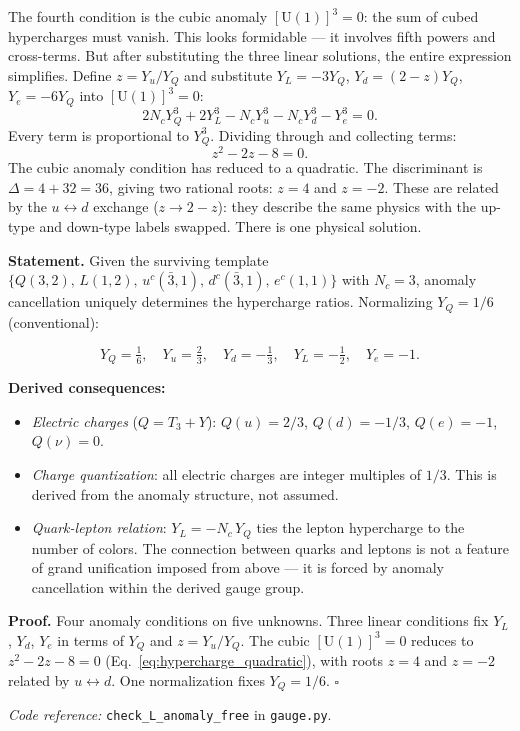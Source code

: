 \documentclass[11pt]{article}
\newenvironment{varlist}{\begin{itemize}[nosep,leftmargin=2em]}{\end{itemize}}
\newcommand{\coderef}[2]{\smallskip\noindent\textit{Code reference:} \texttt{#1} in \texttt{#2}.}
\newcommand{\U}{\mathrm{U}}
\begin{document}
The fourth condition is the cubic anomaly $[\U(1)]^3 = 0$: the sum of cubed hypercharges must vanish.  This looks formidable --- it involves fifth powers and cross-terms.  But after substituting the three linear solutions, the entire expression simplifies.  Define $z = Y_u / Y_Q$ and substitute $Y_L = -3Y_Q$, $Y_d = (2-z)Y_Q$, $Y_e = -6Y_Q$ into $[\U(1)]^3 = 0$:
\begin{equation}
2 N_c Y_Q^3 + 2 Y_L^3 - N_c Y_u^3 - N_c Y_d^3 - Y_e^3 = 0.
\end{equation}
Every term is proportional to $Y_Q^3$.  Dividing through and collecting terms:
\begin{equation}
z^2 - 2z - 8 = 0.
\label{eq:hypercharge_quadratic}
\end{equation}
The cubic anomaly condition has reduced to a quadratic.  The discriminant is $\Delta = 4 + 32 = 36$, giving two rational roots: $z = 4$ and $z = -2$.  These are related by the $u \leftrightarrow d$ exchange ($z \to 2 - z$): they describe the same physics with the up-type and down-type labels swapped.  There is one physical solution.

\begin{tcolorbox}[apfbox, title={$L_{\mathrm{hypercharge}}$ (Unique Hypercharge Assignment)}]
\textbf{Statement.}  Given the surviving template $\{Q(3,2),\, L(1,2),\, u^c(\bar{3},1),\, d^c(\bar{3},1),\, e^c(1,1)\}$ with $N_c = 3$, anomaly cancellation uniquely determines the hypercharge ratios.  Normalizing $Y_Q = 1/6$ (conventional):

\begin{equation}
Y_Q = \tfrac{1}{6}, \quad Y_u = \tfrac{2}{3}, \quad Y_d = -\tfrac{1}{3}, \quad Y_L = -\tfrac{1}{2}, \quad Y_e = -1.
\label{eq:hypercharges}
\end{equation}

\smallskip\noindent\textbf{Derived consequences:}
\begin{varlist}
\item \textit{Electric charges} ($Q = T_3 + Y$): $Q(u) = 2/3$, $Q(d) = -1/3$, $Q(e) = -1$, $Q(\nu) = 0$.
\item \textit{Charge quantization}: all electric charges are integer multiples of $1/3$.  This is derived from the anomaly structure, not assumed.
\item \textit{Quark-lepton relation}: $Y_L = -N_c \, Y_Q$ ties the lepton hypercharge to the number of colors.  The connection between quarks and leptons is not a feature of grand unification imposed from above --- it is forced by anomaly cancellation within the derived gauge group.
\end{varlist}

\smallskip\noindent\textbf{Proof.}  Four anomaly conditions on five unknowns.  Three linear conditions fix $Y_L$, $Y_d$, $Y_e$ in terms of $Y_Q$ and $z = Y_u/Y_Q$.  The cubic $[\U(1)]^3 = 0$ reduces to $z^2 - 2z - 8 = 0$ (Eq.~\ref{eq:hypercharge_quadratic}), with roots $z = 4$ and $z = -2$ related by $u \leftrightarrow d$.  One normalization fixes $Y_Q = 1/6$.  $\square$

\coderef{check\_L\_anomaly\_free}{gauge.py}
\end{tcolorbox}
\end{document}
